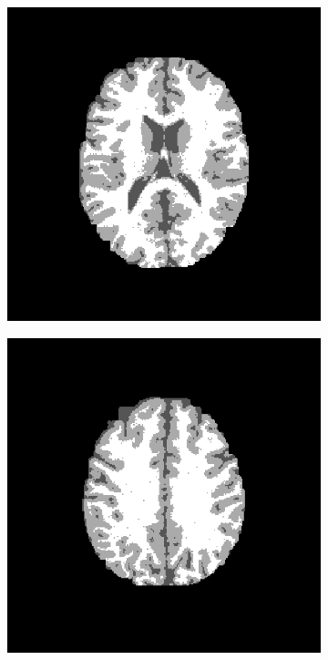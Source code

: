 \begin{figure}[H]
	\centering
	\begin{subfigure}[b]{0.25\linewidth}
		\includegraphics[width=\linewidth]{figures/Module_09/m09_16}
	\end{subfigure}
		\begin{subfigure}[b]{0.25\linewidth}
		\includegraphics[width=\linewidth]{figures/Module_09/m09_17}

\end{subfigure}
\end{figure}
